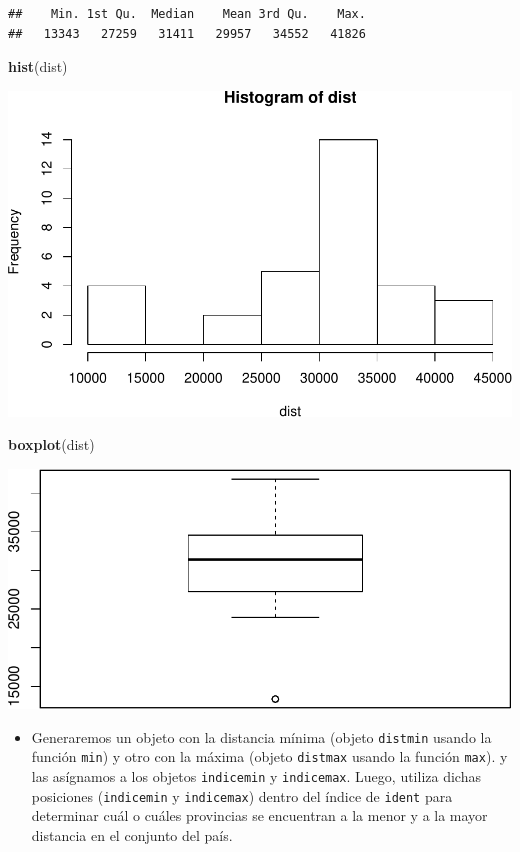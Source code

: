 \documentclass[11pt,]{article}
\newenvironment{Shaded}{\begin{snugshade}}{\end{snugshade}}
\newcommand{\KeywordTok}[1]{\textcolor[rgb]{0.13,0.29,0.53}{\textbf{#1}}}
\newcommand{\NormalTok}[1]{#1}
\providecommand{\tightlist}{%
\setlength{\itemsep}{0pt}\setlength{\parskip}{0pt}}
\begin{document}
\begin{verbatim}
##    Min. 1st Qu.  Median    Mean 3rd Qu.    Max. 
##   13343   27259   31411   29957   34552   41826
\end{verbatim}

\begin{Shaded}
\begin{Highlighting}[]
\KeywordTok{hist}\NormalTok{(dist)}
\end{Highlighting}
\end{Shaded}

\includegraphics{proyecto_files/figure-latex/unnamed-chunk-16-1.pdf}

\begin{Shaded}
\begin{Highlighting}[]
\KeywordTok{boxplot}\NormalTok{(dist)}
\end{Highlighting}
\end{Shaded}

\includegraphics{proyecto_files/figure-latex/unnamed-chunk-16-2.pdf}

\begin{itemize}
\tightlist
\item
  Generaremos un objeto con la distancia mínima (objeto \texttt{distmin}
  usando la función \texttt{min}) y otro con la máxima (objeto
  \texttt{distmax} usando la función \texttt{max}). y las asígnamos a
  los objetos \texttt{indicemin} y \texttt{indicemax}. Luego, utiliza
  dichas posiciones (\texttt{indicemin} y \texttt{indicemax}) dentro del
  índice de \texttt{ident} para determinar cuál o cuáles provincias se
  encuentran a la menor y a la mayor distancia en el conjunto del país.
\end{itemize}
\end{document}
